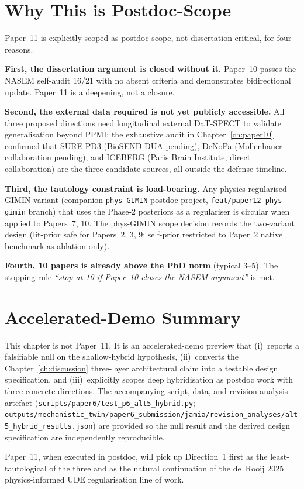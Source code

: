 \section{Why This is Postdoc-Scope}
\label{sec:p11-postdoc-scope}

Paper~11 is explicitly scoped as postdoc-scope, not dissertation-critical, for four reasons.

\textbf{First, the dissertation argument is closed without it.} Paper~10 passes the NASEM self-audit 16/21 with no absent criteria and demonstrates bidirectional update. Paper~11 is a deepening, not a closure.

\textbf{Second, the external data required is not yet publicly accessible.} All three proposed directions need longitudinal external DaT-SPECT to validate generalisation beyond PPMI; the exhaustive audit in Chapter~\ref{ch:paper10} confirmed that SURE-PD3 (BioSEND DUA pending), DeNoPa (Mollenhauer collaboration pending), and ICEBERG (Paris Brain Institute, direct collaboration) are the three candidate sources, all outside the defense timeline.

\textbf{Third, the tautology constraint is load-bearing.} Any physics-regularised GIMIN variant (companion \texttt{phys-GIMIN} postdoc project, \texttt{feat/paper12-phys-gimin} branch) that uses the Phase-2 posteriors as a regulariser is circular when applied to Papers~7, 10. The phys-GIMIN scope decision records the two-variant design (lit-prior safe for Papers~2, 3, 9; self-prior restricted to Paper~2 native benchmark as ablation only).

\textbf{Fourth, 10 papers is already above the PhD norm} (typical 3--5). The stopping rule \emph{``stop at 10 if Paper~10 closes the NASEM argument''} is met.

\section{Accelerated-Demo Summary}
\label{sec:p11-summary}

This chapter is not Paper~11. It is an accelerated-demo preview that (i)~reports a falsifiable null on the shallow-hybrid hypothesis, (ii)~converts the Chapter~\ref{ch:discussion} three-layer architectural claim into a testable design specification, and (iii)~explicitly scopes deep hybridisation as postdoc work with three concrete directions. The accompanying script, data, and revision-analysis artefact (\texttt{scripts/paper6/test\_p6\_alt5\_hybrid.py}; \texttt{outputs/mechanistic\_twin/paper6\_submission/jamia/revision\_analyses/\-alt5\_hybrid\_results.json}) are provided so the null result and the derived design specification are independently reproducible.

Paper~11, when executed in postdoc, will pick up Direction~1 first as the least-tautological of the three and as the natural continuation of the de~Rooij 2025\cite{deRooij2025physiology} physics-informed UDE regularisation line of work.
